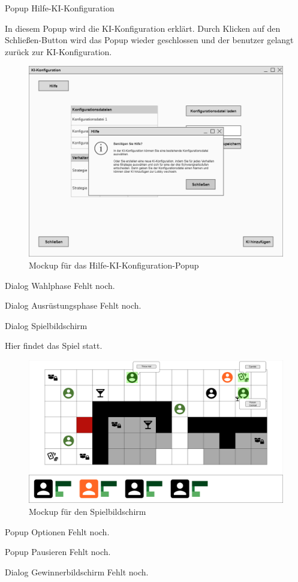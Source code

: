 Popup \glqq{}Hilfe-KI-Konfiguration\grqq{}

In diesem Popup wird die KI-Konfiguration erklärt. Durch Klicken auf den Schließen-Button wird das Popup wieder geschlossen und der benutzer gelangt zurück zur KI-Konfiguration.

\begin{figure}
  \centering
  \includegraphics[width=\textwidth]{Meilenstein03/Hilfe-KI-Konfiguration_Mockup.png}
  \caption{Mockup für das Hilfe-KI-Konfiguration-Popup}
\end{figure}

Dialog \glqq{}Wahlphase\grqq{}
Fehlt noch.

Dialog \glqq{}Ausrüstungsphase\grqq{}
Fehlt noch.

Dialog \glqq{}Spielbildschirm\grqq{}

Hier findet das Spiel statt.

\begin{figure}
  \centering
  \includegraphics[width=\textwidth]{Meilenstein03/Game_Mockup.png}
  \caption{Mockup für den Spielbildschirm}
\end{figure}

Popup \glqq{}Optionen\grqq{}
Fehlt noch.

Popup \glqq{}Pausieren\grqq{}
Fehlt noch.

Dialog \glqq{}Gewinnerbildschirm\grqq{}
Fehlt noch.
